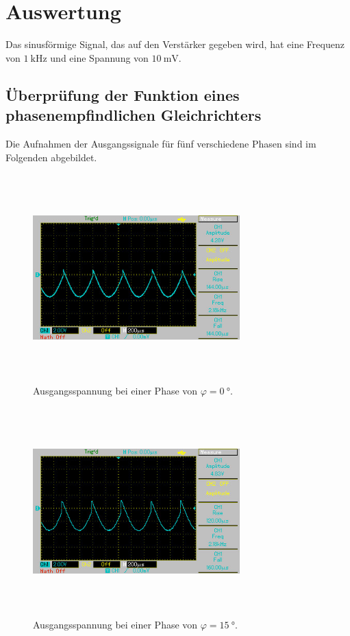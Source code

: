 \section{Auswertung}
\label{sec:Auswertung}

Das sinusförmige Signal, das auf den Verstärker gegeben wird, hat eine Frequenz
von $\SI{1}{\kilo\hertz}$ und eine Spannung von $\SI{10}{\milli\volt}$. %

\subsection{Überprüfung der Funktion eines phasenempfindlichen Gleichrichters}
\label{sec:teil1}
Die Aufnahmen der Ausgangssignale für fünf verschiedene Phasen sind im Folgenden abgebildet.
\begin{figure}
    \centering
    \includegraphics[width=8cm, height=8cm]{build/1.jpg}
    \caption{Ausgangsspannung bei einer Phase von $\varphi = \SI{0}{\degree}$.}
    \label{fig:bild1}
\end{figure}

\begin{figure}
    \centering
    \includegraphics[width=8cm, height=8cm]{build/2.jpg}
    \caption{Ausgangsspannung bei einer Phase von $\varphi = \SI{15}{\degree}$.}
    \label{fig:bild2}
\end{figure}

